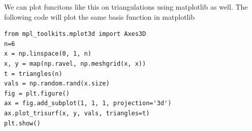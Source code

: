 We can plot funcitons like this on triangulations using matplotlib as well.
The following code will plot the same basis function in matplotlib
\begin{lstlisting}
from mpl_toolkits.mplot3d import Axes3D
n=6
x = np.linspace(0, 1, n)
x, y = map(np.ravel, np.meshgrid(x, x))
t = triangles(n)
vals = np.random.rand(x.size)
fig = plt.figure()
ax = fig.add_subplot(1, 1, 1, projection='3d')
ax.plot_trisurf(x, y, vals, triangles=t)
plt.show()
\end{lstlisting}
